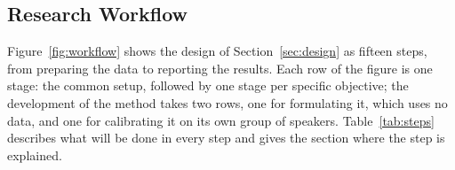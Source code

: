 \subsection{Research Workflow}
\label{sec:workflow}

Figure~\ref{fig:workflow} shows the design of Section~\ref{sec:design} as fifteen steps, from preparing the data to reporting the results. Each row of the figure is one stage: the common setup, followed by one stage per specific objective; the development of the method takes two rows, one for formulating it, which uses no data, and one for calibrating it on its own group of speakers. Table~\ref{tab:steps} describes what will be done in every step and gives the section where the step is explained.




